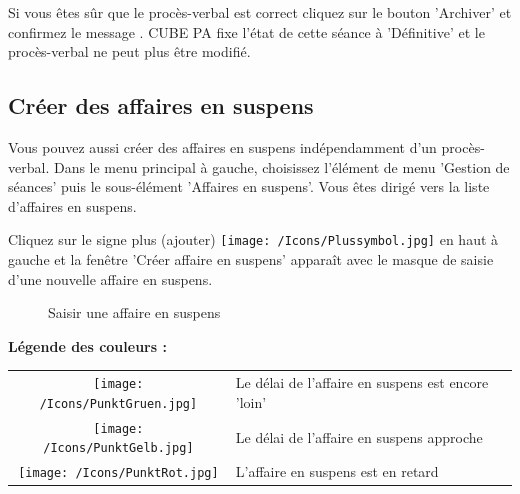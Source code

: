Si vous êtes sûr que le procès-verbal est correct cliquez sur le bouton 'Archiver'  et confirmez le message . CUBE PA fixe l'état de cette séance à 'Définitive' et le procès-verbal ne peut plus être modifié.

\subsection{Créer des affaires en suspens}

Vous pouvez aussi créer des affaires en suspens indépendamment d'un procès-verbal. Dans le menu principal à gauche, choisissez l'élément de menu 'Gestion de séances' puis le sous-élément 'Affaires en suspens'. Vous êtes dirigé vers la liste d'affaires en suspens.

\vspace{\baselineskip}

Cliquez sur le signe plus (ajouter) \texttt{[image: /Icons/Plussymbol.jpg]}  en haut à gauche et la fenêtre 'Créer affaire en suspens' apparaît avec le masque de saisie d'une nouvelle affaire en suspens.

\begin{figure}[H]
\caption{Saisir une affaire en suspens}
\end{figure}

\textbf{Légende des couleurs :}

\begin{tabular}{c p{14cm} l} %
\texttt{[image: /Icons/PunktGruen.jpg]} & Le délai de l'affaire en suspens est encore 'loin' \\
\texttt{[image: /Icons/PunktGelb.jpg]} & Le délai de l'affaire en suspens approche \\
\texttt{[image: /Icons/PunktRot.jpg]} & L'affaire en suspens est en retard \\
\end{tabular}

\vspace{\baselineskip}

